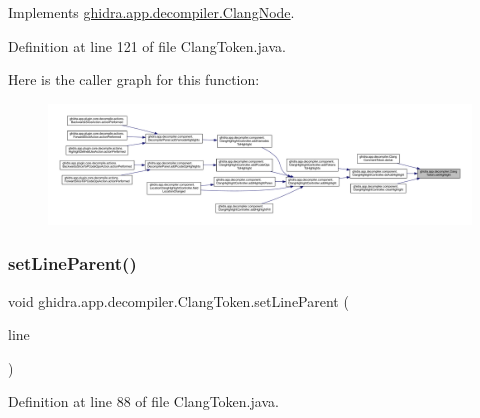 Implements \mbox{\hyperlink{interfaceghidra_1_1app_1_1decompiler_1_1_clang_node_a4c8a1dc76211ce497441c58554675f55}{ghidra.\+app.\+decompiler.\+Clang\+Node}}.



Definition at line 121 of file Clang\+Token.\+java.

Here is the caller graph for this function\+:
\nopagebreak
\begin{figure}[H]
\begin{center}
\leavevmode
\includegraphics[width=350pt]{classghidra_1_1app_1_1decompiler_1_1_clang_token_abc4aa5a1ad389a7bc71377aee25048e0_icgraph}
\end{center}
\end{figure}
\mbox{\label{classghidra_1_1app_1_1decompiler_1_1_clang_token_abc305091ad910f273f840684392739c2}} 
\subsubsection{\texorpdfstring{setLineParent()}{setLineParent()}}
{\footnotesize\ttfamily void ghidra.\+app.\+decompiler.\+Clang\+Token.\+set\+Line\+Parent (\begin{DoxyParamCaption}\item[{\mbox{\hyperlink{classghidra_1_1app_1_1decompiler_1_1_clang_line}{Clang\+Line}}}]{line }\end{DoxyParamCaption})\hspace{0.3cm}{\ttfamily [inline]}}



Definition at line 88 of file Clang\+Token.\+java.

